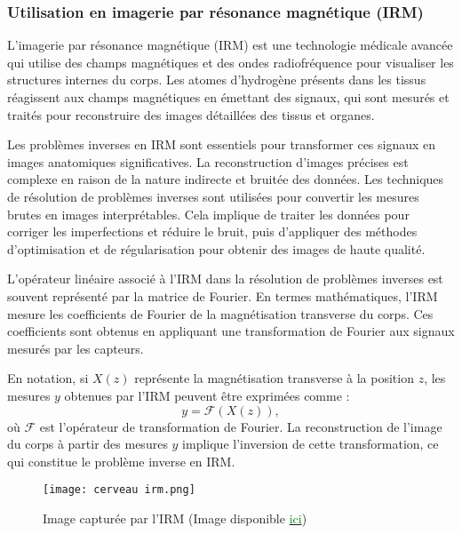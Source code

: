 \documentclass[a4paper, 12pt]{report} %
\begin{document}
\subsubsection{Utilisation en imagerie par résonance magnétique (IRM) }

L'imagerie par résonance magnétique (IRM) est une technologie médicale avancée qui utilise des champs magnétiques et des ondes radiofréquence pour visualiser les structures internes du corps. Les atomes d'hydrogène présents dans les tissus réagissent aux champs magnétiques en émettant des signaux, qui sont mesurés et traités pour reconstruire des images détaillées des tissus et organes.

Les problèmes inverses en IRM sont essentiels pour transformer ces signaux en images anatomiques significatives. La reconstruction d'images précises est complexe en raison de la nature indirecte et bruitée des données. Les techniques de résolution de problèmes inverses sont utilisées pour convertir les mesures brutes en images interprétables. Cela implique de traiter les données pour corriger les imperfections et réduire le bruit, puis d'appliquer des méthodes d'optimisation et de régularisation pour obtenir des images de haute qualité.

L'opérateur linéaire associé à l'IRM dans la résolution de problèmes inverses est souvent représenté par la matrice de Fourier. En termes mathématiques, l'IRM mesure les coefficients de Fourier de la magnétisation transverse du corps. Ces coefficients sont obtenus en appliquant une transformation de Fourier aux signaux mesurés par les capteurs.

En notation, si \( X(z) \) représente la magnétisation transverse à la position \( z \), les mesures \( y \) obtenues par l'IRM peuvent être exprimées comme :
\[
y = \mathcal{F}(X(z)),
\]
où \( \mathcal{F} \) est l'opérateur de transformation de Fourier. La reconstruction de l'image du corps à partir des mesures \( y \) implique l'inversion de cette transformation, ce qui constitue le problème inverse en IRM.


\begin{figure}[H] %
    \begin{center}
    \texttt{[image: cerveau irm.png]}
    \caption{Image capturée par l'IRM (Image disponible \href{https://www.lesnumeriques.com/sante-sport/des-images-inedites-du-cerveau-humain-ont-ete-capturees-par-le-plus-puissant-irm-au-monde-n220416.html}{\textcolor{green}{ici}})}
    \label{fig:2}
    \end{center}
\end{figure}
\end{document}

